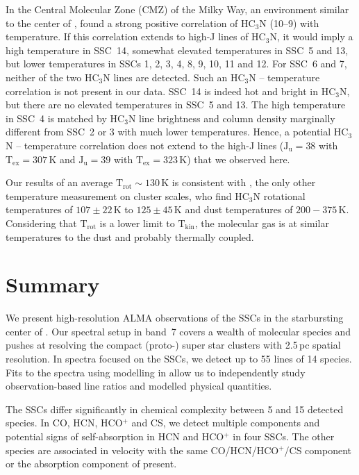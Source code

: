 In the Central Molecular Zone (CMZ) of the Milky Way, an environment similar to the center of , \citet{2018ApJS..236...40T} found a strong positive correlation of HC$_3$N (10--9) with temperature. If this correlation extends to high-J lines of HC$_3$N, it would imply a high temperature in SSC~14, somewhat elevated temperatures in SSC~5 and 13, but lower temperatures in SSCs 1, 2, 3, 4, 8, 9, 10, 11 and 12. For SSC~6 and 7, neither of the two HC$_3$N lines are detected.
Such an HC$_3$N -- temperature correlation is not present in our data. SSC~14 is indeed hot and bright in HC$_3$N, but there are no elevated temperatures in SSC~5 and 13. The high temperature in SSC~4 is matched by HC$_3$N line brightness and column density marginally different from SSC~2 or 3 with much lower temperatures.
Hence, a potential HC$_3$N -- temperature correlation does not extend to the high-J lines ($\mathrm{J_u}=38$ with $\mathrm{T_{ex}}=307$\,K and $\mathrm{J_u}=39$ with $\mathrm{T_{ex}}=323$\,K) that we observed here.

Our results of an average $\mathrm{T_{rot}}\sim 130$\,K is consistent with \citet{2020MNRAS.491.4573R}, the only other temperature measurement on cluster scales, who find HC$_3$N rotational temperatures of $107\pm22$\,K to $125\pm45$\,K and dust temperatures of $200-375$\,K. Considering that $\mathrm{T_{rot}}$ is a lower limit to $\mathrm{T_{kin}}$, the molecular gas is at similar temperatures to the dust and probably thermally coupled.



\section{Summary}\label{SSCs: section: summary}

We present high-resolution ALMA observations of the SSCs in the starbursting center of . Our spectral setup in band~7 covers a wealth of molecular species and pushes at resolving the compact (proto-) super star clusters with 2.5\,pc spatial resolution. In spectra focused on the SSCs, we detect up to 55 lines of 14 species. Fits to the spectra using modelling in \xclass allow us to independently study observation-based line ratios and modelled physical quantities.

The SSCs differ significantly in chemical complexity between 5 and 15 detected species. In CO, HCN, HCO$^+$ and CS, we detect multiple components and potential signs of self-absorption in HCN and HCO$^+$ in four SSCs. The other species are associated in velocity with the same CO/HCN/HCO$^+$/CS component or the absorption component of present.

